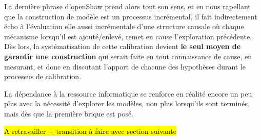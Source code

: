La dernière phrase d'openShaw prend alors tout son sens, et en nous rapellant que la construction de modèle est un processus incrémental, il fait indirectement écho à l'évaluation elle aussi incrémentale d'une structure causale où chaque mécanisme lorsqu'il est ajouté/enlevé, remet en cause l'exploration précédente. Dès lors, la systématisation de cette calibration devient \textbf{le seul moyen de garantir une construction} qui serait faite en tout connaissance de cause, en mesurant, et donc en discutant l'apport de chacune des hypothèses durant le processus de calibration.

La dépendance à la ressource informatique se renforce en réalité encore un peu plus avec la nécessité d'explorer les modèles, non plus lorsqu'ils sont terminés, mais dès que la première brique est posé. 

\hl{A retravailler + transition à faire avec section suivante}





